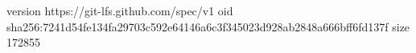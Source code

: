 version https://git-lfs.github.com/spec/v1
oid sha256:7241d54fe134fa29703c592e64146a6c3f345023d928ab2848a666bff6fd137f
size 172855
